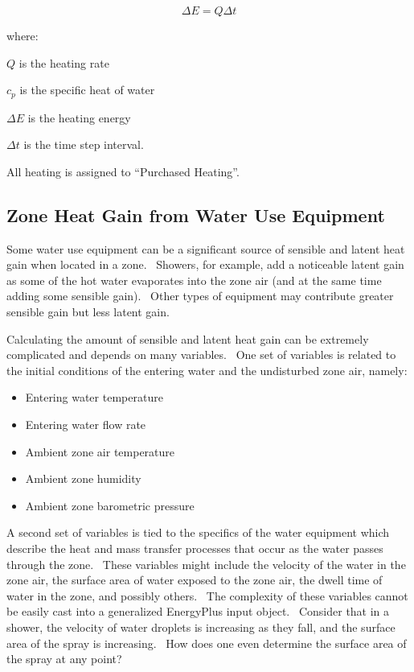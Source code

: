 \begin{equation}
\Delta E = Q\Delta t
\end{equation}

where:

\(Q\) is the heating rate

\({c_p}\) is the specific heat of water

\(\Delta E\) is the heating energy

\(\Delta t\) is the time step interval.

All heating is assigned to ``Purchased Heating''.

\subsection{Zone Heat Gain from Water Use Equipment}\label{zone-heat-gain-from-water-use-equipment}

Some water use equipment can be a significant source of sensible and latent heat gain when located in a zone.~ Showers, for example, add a noticeable latent gain as some of the hot water evaporates into the zone air (and at the same time adding some sensible gain).~ Other types of equipment may contribute greater sensible gain but less latent gain.

Calculating the amount of sensible and latent heat gain can be extremely complicated and depends on many variables.~ One set of variables is related to the initial conditions of the entering water and the undisturbed zone air, namely:

\begin{itemize}
\item
  Entering water temperature
\item
  Entering water flow rate
\item
  Ambient zone air temperature
\item
  Ambient zone humidity
\item
  Ambient zone barometric pressure
\end{itemize}

A second set of variables is tied to the specifics of the water equipment which describe the heat and mass transfer processes that occur as the water passes through the zone.~ These variables might include the velocity of the water in the zone air, the surface area of water exposed to the zone air, the dwell time of water in the zone, and possibly others.~ The complexity of these variables cannot be easily cast into a generalized EnergyPlus input object.~ Consider that in a shower, the velocity of water droplets is increasing as they fall, and the surface area of the spray is increasing.~ How does one even determine the surface area of the spray at any point?


